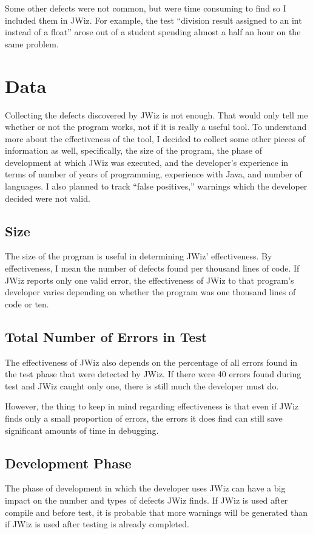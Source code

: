 Some other defects were not common, but were time consuming to find so I
included them in JWiz.  For example, the test ``division result assigned to
an int instead of a float'' arose out of a student spending almost a half
an hour on the same problem.

\section{Data}
Collecting the defects discovered by JWiz is not enough.  That would only
tell me whether or not the program works, not if it is really a useful
tool.  To understand more about the effectiveness of the tool, I decided to
collect some other pieces of information as well, specifically, the size of
the program, the phase of development at which JWiz was executed, and the
developer's experience in terms of number of years of programming,
experience with Java, and number of languages.  I also planned to track
``false positives,'' warnings which the developer decided were not valid.

\subsection{Size}
The size of the program is useful in determining JWiz' effectiveness.  By
effectiveness, I mean the number of defects found per thousand lines of
code.  If JWiz reports only one valid error, the effectiveness of JWiz to
that program's developer varies depending on whether the program was one
thousand lines of code or ten.

\subsection{Total Number of Errors in Test} 
The effectiveness of JWiz also depends on the percentage of all errors
found in the test phase that were detected by JWiz.  If there were 40
errors found during test and JWiz caught only one, there is still much the
developer must do.

However, the thing to keep in mind regarding effectiveness is that even if
JWiz finds only a small proportion of errors, the errors it does find can
still save significant amounts of time in debugging.

\subsection{Development Phase}
The phase of development in which the developer uses JWiz can have a big
impact on the number and types of defects JWiz finds.  If JWiz is used
after compile and before test, it is probable that more warnings will be
generated than if JWiz is used after testing is already completed.


